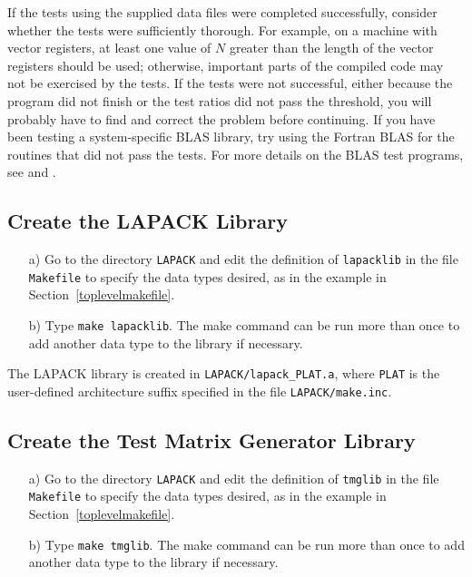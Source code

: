 \documentclass[11pt]{report}
\begin{document}
If the tests using the supplied data files were completed successfully,
consider whether the tests were sufficiently thorough.
For example, on a machine with vector registers, at least one value
of $N$ greater than the length of the vector registers should be used;
otherwise, important parts of the compiled code may not be
exercised by the tests. 
If the tests were not successful, either because the program did not
finish or the test ratios did not pass the threshold, you will
probably have to find and correct the problem before continuing. 
If you have been testing a system-specific
BLAS library, try using the Fortran BLAS for the routines that
did not pass the tests.
For more details on the BLAS test programs, 
see \cite{BLAS2-test} and \cite{BLAS3-test}.

\subsection{Create the LAPACK Library}

\begin{itemize}
\item[a)]
Go to the directory \texttt{LAPACK} and edit the definition of
\texttt{lapacklib} in the file \texttt{Makefile} to specify the data types desired,
as in the example in Section~\ref{toplevelmakefile}.

\item[b)]
Type \texttt{make lapacklib}.
The make command can be run more than once to add another
data type to the library if necessary.  

\end{itemize}

\noindent
The LAPACK library is created in \texttt{LAPACK/lapack\_PLAT.a}, where
\texttt{PLAT} is the user-defined architecture suffix specified in the file
\texttt{LAPACK/make.inc}.

\subsection{Create the Test Matrix Generator Library}

\begin{itemize}
\item[a)]
Go to the directory \texttt{LAPACK} and edit the definition of \texttt{tmglib}
in the file \texttt{Makefile} to specify the data types desired, as in the
example in Section~\ref{toplevelmakefile}.

\item[b)]
Type \texttt{make tmglib}.
The make command can be run more than once to add another
data type to the library if necessary.  

\end{itemize}
\end{document}

